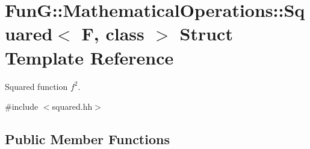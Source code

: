 \hypertarget{structFunG_1_1MathematicalOperations_1_1Squared}{\section{\-Fun\-G\-:\-:\-Mathematical\-Operations\-:\-:\-Squared$<$ \-F, class $>$ \-Struct \-Template \-Reference}
\label{structFunG_1_1MathematicalOperations_1_1Squared}
}


\-Squared function $f^2$.  




{\ttfamily \#include $<$squared.\-hh$>$}

\subsection*{\-Public \-Member \-Functions}
